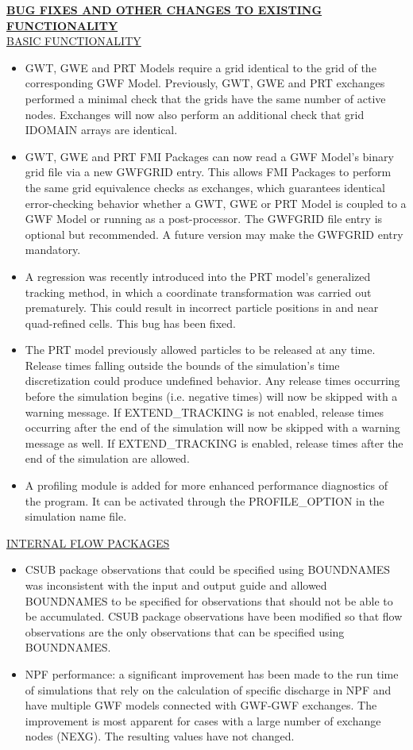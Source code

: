 \textbf{\underline{BUG FIXES AND OTHER CHANGES TO EXISTING FUNCTIONALITY}} \\
\underline{BASIC FUNCTIONALITY}
\begin{itemize}
	\item GWT, GWE and PRT Models require a grid identical to the grid of the corresponding GWF Model. Previously, GWT, GWE and PRT exchanges performed a minimal check that the grids have the same number of active nodes. Exchanges will now also perform an additional check that grid IDOMAIN arrays are identical.
	\item GWT, GWE and PRT FMI Packages can now read a GWF Model's binary grid file via a new GWFGRID entry. This allows FMI Packages to perform the same grid equivalence checks as exchanges, which guarantees identical error-checking behavior whether a GWT, GWE or PRT Model is coupled to a GWF Model or running as a post-processor. The GWFGRID file entry is optional but recommended. A future version may make the GWFGRID entry mandatory.
	\item A regression was recently introduced into the PRT model's generalized tracking method, in which a coordinate transformation was carried out prematurely. This could result in incorrect particle positions in and near quad-refined cells. This bug has been fixed.
	\item The PRT model previously allowed particles to be released at any time. Release times falling outside the bounds of the simulation's time discretization could produce undefined behavior. Any release times occurring before the simulation begins (i.e. negative times) will now be skipped with a warning message. If EXTEND\_TRACKING is not enabled, release times occurring after the end of the simulation will now be skipped with a warning message as well. If EXTEND\_TRACKING is enabled, release times after the end of the simulation are allowed.
	\item A profiling module is added for more enhanced performance diagnostics of the program. It can be activated through the PROFILE\_OPTION in the simulation name file.
\end{itemize}

\underline{INTERNAL FLOW PACKAGES}
\begin{itemize}
	\item CSUB package observations that could be specified using BOUNDNAMES was inconsistent with the input and output guide and allowed BOUNDNAMES to be specified for observations that should not be able to be accumulated. CSUB package observations have been modified so that flow observations are the only observations that can be specified using BOUNDNAMES.
	\item NPF performance: a significant improvement has been made to the run time of simulations that rely on the calculation of specific discharge in NPF and have multiple GWF models connected with GWF-GWF exchanges. The improvement is most apparent for cases with a large number of exchange nodes (NEXG). The resulting values have not changed.
\end{itemize}

